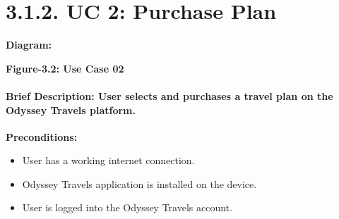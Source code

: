 \documentclass{scrreprt}
\begin{document}
\section*{\textbf{3.1.2. UC 2: Purchase Plan}}
\textbf{Diagram:}
\newline
\newline
\begin{center}
    \parbox{0.8\textwidth}{ 
        \centering
    }
\end{center}

\begin{center}
    \parbox{0.8\textwidth}{ 
        \centering
        \textbf{Figure-3.2: Use Case 02}
    }
\end{center}
\paragraph {\textnormal{Brief Description: 
User selects and purchases a travel plan on the Odyssey Travels platform.\newline
}}
\textbf{Preconditions:}
\begin{itemize}
    \item User has a working internet connection.
    \item Odyssey Travels application is installed on the device.
    \item User is logged into the Odyssey Travels account.
\end{itemize}
\end{document}
